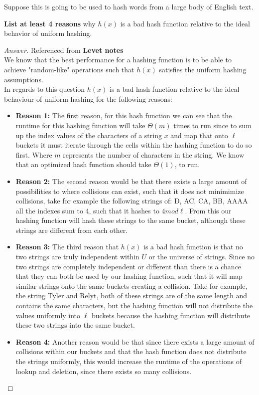 \documentclass[11pt]{article}
\theoremstyle{definition}
\theoremstyle{definition}
\theoremstyle{definition}
\begin{document}
Suppose this is going to be used to hash words from a large body of English text.
	
\textbf{List at least 4 reasons} why $h(x)$ is a bad hash function relative to the ideal behavior of uniform hashing.

\begin{proof}[Answer] Referenced from \textbf{Levet notes}\\
We know that the best performance for a hashing function is to be able to achieve "random-like" operations such that $h(x)$ satisfies the uniform hashing assumptions. \\

In regards to this question $h(x)$ is a bad hash function relative to the ideal behaviour of uniform hashing for the following reasons: \\
\begin{itemize}
\item \textbf{Reason 1:}
The first reason, for this hash function we can see that the runtime for this hashing function will take $\Theta(m)$ times to run since to sum up the index values of the characters of a string $x$ and map that onto $\ell$ buckets it must iterate through the cells within the hashing function to do so first. Where $m$ represents the number of characters in the string. We know that an optimized hash function should take $\Theta(1)$, to run.
\item \textbf{Reason 2:}
The second reason would be that there exists a large amount of possibilities to where collisions can exist, such that it does not minimimize collisions, take for example the following strings of: D, AC, CA, BB, AAAA all the indexes sum to 4, such that it hashes to $4mod\ell$. From this our hashing function will hash these strings to the same bucket, although these strings are different from each other.
\item \textbf{Reason 3:}
The third reason that $h(x)$ is a bad hash function is that no two strings are truly independent within $U$ or the universe of strings. Since no two strings are completely independent or different than there is a chance that they can both be used by our hashing function, such that it will map similar strings onto the same buckets creating a collision. Take for example, the string Tyler and Relyt, both of these strings are of the same length and contains the same characters, but the hashing function will not distribute the values uniformly into $\ell$ buckets because the hashing function will distribute these two strings into the same bucket.
\item \textbf{Reason 4:}
Another reason would be that since there exists a large amount of collisions within our buckets and that the hash function does not distribute the strings uniformly, this would increase the runtime of the operations of lookup and deletion, since there exists so many collisions.
\end{itemize}
\end{proof}
\end{document}
